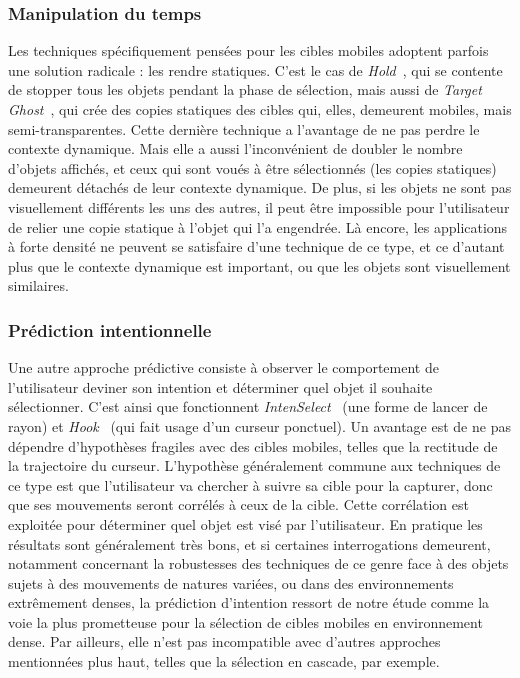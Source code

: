 	\subsubsection{Manipulation du temps}
    Les techniques spécifiquement pensées pour les cibles mobiles adoptent parfois une solution radicale : les rendre statiques. C'est le cas de \emph{Hold}~\cite{hajri2011moving}, qui se contente de stopper tous les objets pendant la phase de sélection, mais aussi de \emph{Target Ghost}~\cite{hasan2011comet}, qui crée des copies statiques des cibles qui, elles, demeurent mobiles, mais semi-transparentes. Cette dernière technique a l'avantage de ne pas perdre le contexte dynamique. Mais elle a aussi l'inconvénient de doubler le nombre d'objets affichés, et ceux qui sont voués à être sélectionnés (les copies statiques) demeurent détachés de leur contexte dynamique. De plus, si les objets ne sont pas visuellement différents les uns des autres, il peut être impossible pour l'utilisateur de relier une copie statique à l'objet qui l'a engendrée. Là encore, les applications à forte densité ne peuvent se satisfaire d'une technique de ce type, et ce d'autant plus que le contexte dynamique est important, ou que les objets sont visuellement similaires.
    
	\subsubsection{Prédiction intentionnelle}
    Une autre approche prédictive consiste à observer le comportement de l'utilisateur deviner son intention et déterminer quel objet il souhaite sélectionner. C'est ainsi que fonctionnent \emph{IntenSelect}~\cite{de2005intenselect} (une forme de lancer de rayon) et \emph{Hook}~\cite{ortega2013hook} (qui fait usage d'un curseur ponctuel). Un avantage est de ne pas dépendre d'hypothèses \og fragiles \fg{} avec des cibles mobiles, telles que la rectitude de la trajectoire du curseur. L'hypothèse généralement commune aux techniques de ce type est que l'utilisateur va chercher à \og suivre \fg{} sa cible pour la capturer, donc que ses mouvements seront corrélés à ceux de la cible. Cette corrélation est exploitée pour déterminer quel objet est visé par l'utilisateur. En pratique les résultats sont généralement très bons, et si certaines interrogations demeurent, notamment concernant la robustesses des techniques de ce genre face à des objets sujets à des mouvements de natures variées, ou dans des environnements extrêmement denses, la prédiction d'intention ressort de notre étude comme la voie la plus prometteuse pour la sélection de cibles mobiles en environnement dense. Par ailleurs, elle n'est pas incompatible avec d'autres approches mentionnées plus haut, telles que la sélection en cascade, par exemple.
    
